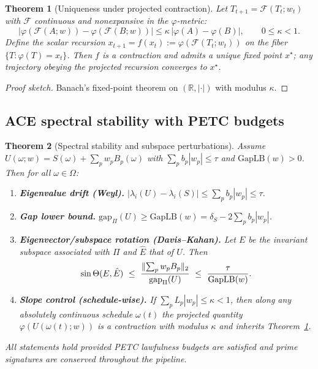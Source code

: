 \documentclass[11pt]{article}
\DeclarePairedDelimiter{\norm}{\lVert}{\rVert}
\newcommand{\R}{\mathbb{R}}
\newcommand{\GapLB}{\mathrm{GapLB}}
\newcommand{\gapPi}[1]{\mathrm{gap}_{\Pi}\!\left(#1\right)}
\theoremstyle{plain}
\newtheorem{theorem}{Theorem}
\theoremstyle{definition}
\theoremstyle{remark}
\begin{document}
\begin{theorem}[Uniqueness under projected contraction]
\label{thm:uniqueness}
Let $T_{t+1}=\mathcal{F}(T_t;w_t)$ with $\mathcal{F}$ continuous and nonexpansive in the $\varphi$-metric:
\[
\big|\varphi(\mathcal{F}(A;w))-\varphi(\mathcal{F}(B;w))\big|\le \kappa\,\big|\varphi(A)-\varphi(B)\big|,\qquad 0\le \kappa<1.
\]
Define the scalar recursion $x_{t+1}=f(x_t):=\varphi(\mathcal{F}(T_t;w_t))$ on the fiber $\{T:\varphi(T)=x_t\}$. Then $f$ is a contraction and admits a unique fixed point $x^\star$; any trajectory obeying the projected recursion converges to $x^\star$.
\end{theorem}
\begin{proof}[Proof sketch]
Banach's fixed-point theorem on $(\R,|\cdot|)$ with modulus $\kappa$.
\end{proof}

\subsection{ACE spectral stability with PETC budgets}
\begin{theorem}[Spectral stability and subspace perturbations]
\label{thm:stability}
Assume $U(\omega;w)=S(\omega)+\sum_p w_pB_p(\omega)$ with $\sum_p b_p|w_p|\le \tau$ and $\GapLB(w)>0$. Then for all $\omega\in\Omega$:
\begin{enumerate}[leftmargin=2em]
\item \textbf{Eigenvalue drift (Weyl).} $|\lambda_i(U)-\lambda_i(S)|\le \sum_p b_p|w_p|\le \tau$.
\item \textbf{Gap lower bound.} $\gapPi{U}\ge \GapLB(w)=\delta_S-2\sum_p b_p|w_p|$.
\item \textbf{Eigenvector/subspace rotation (Davis--Kahan).} Let $E$ be the invariant subspace associated with $\Pi$ and $\hat E$ that of $U$. Then
\[
\sin\Theta(E,\hat E)\ \le\ \frac{\norm{\sum_p w_p B_p}_2}{\gapPi{U}}\ \le\ \frac{\tau}{\GapLB(w)}.
\]
\item \textbf{Slope control (schedule-wise).} If $\sum_p L_p|w_p|\le \kappa<1$, then along any absolutely continuous schedule $\omega(t)$ the projected quantity $\varphi\!\left(U(\omega(t);w)\right)$ is a contraction with modulus $\kappa$ and inherits Theorem~\ref{thm:uniqueness}.
\end{enumerate}
All statements hold provided PETC lawfulness budgets are satisfied and prime signatures are conserved throughout the pipeline.
\end{theorem}
\end{document}
